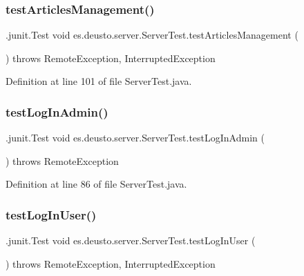 \subsubsection{\texorpdfstring{test\+Articles\+Management()}{testArticlesManagement()}}
{\footnotesize\ttfamily .junit.\+Test void es.\+deusto.\+server.\+Server\+Test.\+test\+Articles\+Management (\begin{DoxyParamCaption}{ }\end{DoxyParamCaption}) throws Remote\+Exception, Interrupted\+Exception}



Definition at line 101 of file Server\+Test.\+java.

\mbox{\label{classes_1_1deusto_1_1server_1_1_server_test_ade2896be992e43bbfb29ba455da9d335}} 
\subsubsection{\texorpdfstring{test\+Log\+In\+Admin()}{testLogInAdmin()}}
{\footnotesize\ttfamily .junit.\+Test void es.\+deusto.\+server.\+Server\+Test.\+test\+Log\+In\+Admin (\begin{DoxyParamCaption}{ }\end{DoxyParamCaption}) throws Remote\+Exception}



Definition at line 86 of file Server\+Test.\+java.

\mbox{\label{classes_1_1deusto_1_1server_1_1_server_test_a7c2dd5cf5eb68dbf35b10f6c29b6734f}} 
\subsubsection{\texorpdfstring{test\+Log\+In\+User()}{testLogInUser()}}
{\footnotesize\ttfamily .junit.\+Test void es.\+deusto.\+server.\+Server\+Test.\+test\+Log\+In\+User (\begin{DoxyParamCaption}{ }\end{DoxyParamCaption}) throws Remote\+Exception, Interrupted\+Exception}



